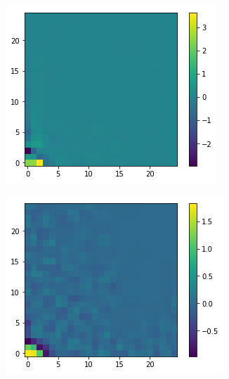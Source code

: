 \documentclass[11pt]{article}
\begin{document}
\begin{figure}[h]
	\centering
	\begin{subfigure}{0.3\textwidth}
		\centering
		\includegraphics[width=\textwidth]{ising_images/logreg_2d_2019}
	\end{subfigure}
	\begin{subfigure}{0.3\textwidth}
		\centering
		\includegraphics[width=\textwidth]{ising_images/logreg_2d_ising}
	\end{subfigure}

\end{figure}
\end{document}
